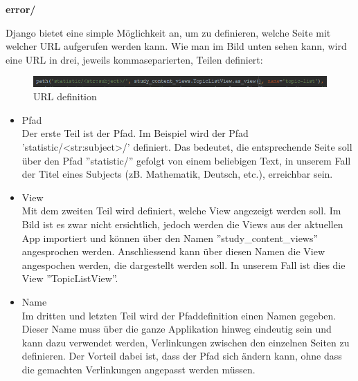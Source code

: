 \begin{table}[h]
\begin{tabu}
		\textbf{error/} \\
	\end{tabu}
\end{table}


Django bietet eine simple Möglichkeit an, um zu definieren, welche Seite mit welcher URL aufgerufen werden kann. Wie man im Bild unten sehen kann, wird eine URL in drei, jeweils kommaseparierten, Teilen definiert:

\begin{minipage}{\textwidth}
	\begin{figure}[H]
		\includegraphics[width=\textwidth, height=\textheight, keepaspectratio]{images/URLBsp.png}
		\caption{URL definition}
	\end{figure}
\end{minipage}


\begin{itemize}
	\itemsep0em
	\item Pfad \\
	Der erste Teil ist der Pfad. Im Beispiel wird der Pfad 'statistic/<str:subject>/' definiert. Das bedeutet, die entsprechende Seite soll über den Pfad ''statistic/'' gefolgt von einem beliebigen Text, in unserem Fall der Titel eines Subjects (zB. Mathematik, Deutsch, etc.), erreichbar sein. 
	\item View \\
	Mit dem zweiten Teil wird definiert, welche View angezeigt werden soll. Im Bild ist es zwar nicht ersichtlich, jedoch werden die Views aus der aktuellen App importiert und können über den Namen ''study\_content\_views'' angesprochen werden. Anschliessend kann über diesen Namen die View angespochen werden, die dargestellt werden soll. In unserem Fall ist dies die View ''TopicListView''.
	\item Name \\
	Im dritten und letzten Teil wird der Pfaddefinition einen Namen gegeben. Dieser Name muss über die ganze Applikation hinweg eindeutig sein und kann dazu verwendet werden, Verlinkungen zwischen den einzelnen Seiten zu definieren. Der Vorteil dabei ist, dass der Pfad sich ändern kann, ohne dass die gemachten Verlinkungen angepasst werden müssen.
\end{itemize}


